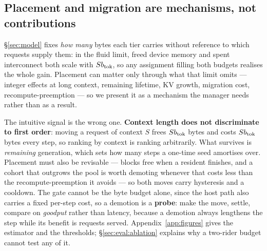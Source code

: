 \subsection{Placement and migration are mechanisms, not contributions}
\label{sec:design:placement}

\S\ref{sec:model} fixes \emph{how many} bytes each tier carries without reference
to which requests supply them: in the fluid limit, freed device memory and spent
interconnect both scale with $Sb_{\mathrm{tok}}$, so any assignment filling both budgets
realises the whole gain. Placement can matter only through what that limit omits
--- integer effects at long context, remaining lifetime, KV growth, migration
cost, recompute-preemption --- so we present it as a mechanism the manager needs
rather than as a result.

The intuitive signal is the wrong one. \textbf{Context length does not discriminate
to first order}: moving a request of context $S$ frees $Sb_{\mathrm{tok}}$ bytes and costs
$Sb_{\mathrm{tok}}$ bytes every step, so ranking by context is ranking arbitrarily. What
survives is \emph{remaining} generation, which sets how many steps a one-time seed
amortises over. Placement must also be revisable --- blocks free when a resident
finishes, and a cohort that outgrows the pool is worth demoting whenever that costs
less than the recompute-preemption it avoids --- so both moves carry hysteresis and a
cooldown. The gate cannot be the byte budget alone, since the host path also carries
a fixed per-step cost, so a demotion is a \textbf{probe}: make the move, settle,
compare on \emph{goodput} rather than latency, because a demotion always lengthens
the step while its benefit is requests served. Appendix~\ref{app:figures} gives the
estimator and the thresholds; \S\ref{sec:eval:ablation} explains why a two-rider
budget cannot test any of it.
\label{sec:design:migration}
